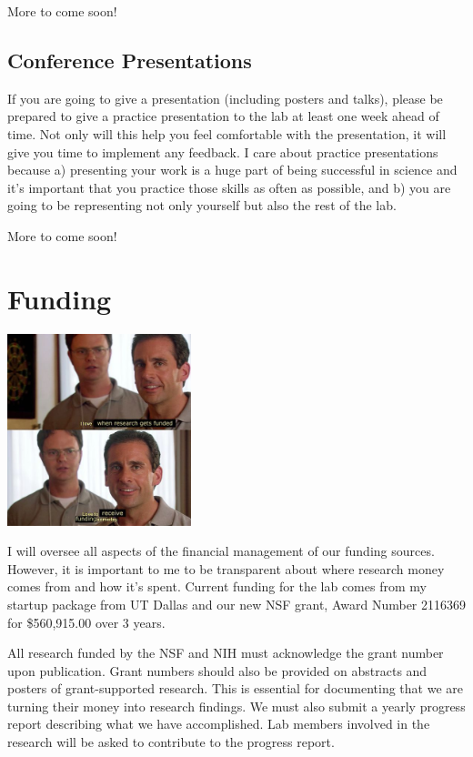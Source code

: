 \documentclass[]{book}
\begin{document}
More to come soon!

\hypertarget{conference-presentations}{%
\subsection{Conference Presentations}\label{conference-presentations}}

If you are going to give a presentation (including posters and talks), please be prepared to give a practice presentation to the lab at least one week ahead of time. Not only will this help you feel comfortable with the presentation, it will give you time to implement any feedback. I care about practice presentations because a) presenting your work is a huge part of being successful in science and it's important that you practice those skills as often as possible, and b) you are going to be representing not only yourself but also the rest of the lab.

More to come soon!

\hypertarget{funding}{%
\section{Funding}\label{funding}}

\includegraphics[width=0.4\textwidth,height=\textheight]{images/inside_joke_funding.jpg}

I will oversee all aspects of the financial management of our funding sources. However, it is important to me to be transparent about where research money comes from and how it's spent. Current funding for the lab comes from my startup package from UT Dallas and our new NSF grant, Award Number 2116369 for \$560,915.00 over 3 years.

All research funded by the NSF and NIH must acknowledge the grant number upon publication. Grant numbers should also be provided on abstracts and posters of grant-supported research. This is essential for documenting that we are turning their money into research findings. We must also submit a yearly progress report describing what we have accomplished. Lab members involved in the research will be asked to contribute to the progress report.
\end{document}
